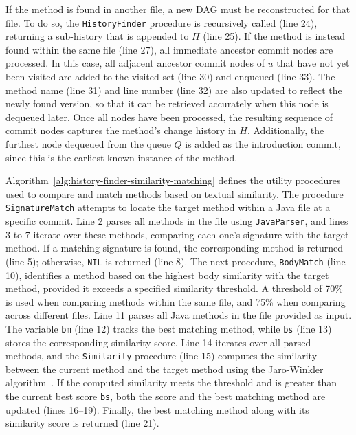 If the method is found in another file, a new DAG must be reconstructed for that file. To do so, the \texttt{HistoryFinder} procedure is recursively called (line 24), returning a sub-history that is appended to \( H \) (line 25). If the method is instead found within the same file (line 27), all immediate ancestor commit nodes are processed. In this case, all adjacent ancestor commit nodes of \( u \) that have not yet been visited are added to the visited set (line 30) and enqueued (line 33). The method name (line 31) and line number (line 32) are also updated to reflect the newly found version, so that it can be retrieved accurately when this node is dequeued later. Once all nodes have been processed, the resulting sequence of commit nodes captures the method’s change history in \(H\). Additionally, the furthest node dequeued from the queue $Q$ is added as the introduction commit, since this is the earliest known instance of the method.

Algorithm~\ref{alg:history-finder-similarity-matching} defines the utility procedures used to compare and match methods based on textual similarity. The procedure \texttt{SignatureMatch} attempts to locate the target method within a Java file at a specific commit. Line 2 parses all methods in the file using \texttt{JavaParser}, and lines 3 to 7 iterate over these methods, comparing each one’s signature with the target method. If a matching signature is found, the corresponding method is returned (line 5); otherwise, \texttt{NIL} is returned (line 8). The next procedure, \texttt{BodyMatch} (line 10), identifies a method based on the highest body similarity with the target method, provided it exceeds a specified similarity threshold. A threshold of 70\% is used when comparing methods within the same file, and 75\% when comparing across different files. Line 11 parses all Java methods in the file provided as input. The variable \texttt{bm} (line 12) tracks the best matching method, while \texttt{bs} (line 13) stores the corresponding similarity score. Line 14 iterates over all parsed methods, and the \texttt{Similarity} procedure (line 15) computes the similarity between the current method and the target method using the Jaro-Winkler algorithm~\cite{winkler90}. If the computed similarity meets the threshold and is greater than the current best score \texttt{bs}, both the score and the best matching method are updated (lines 16–19). Finally, the best matching method along with its similarity score is returned (line 21).

